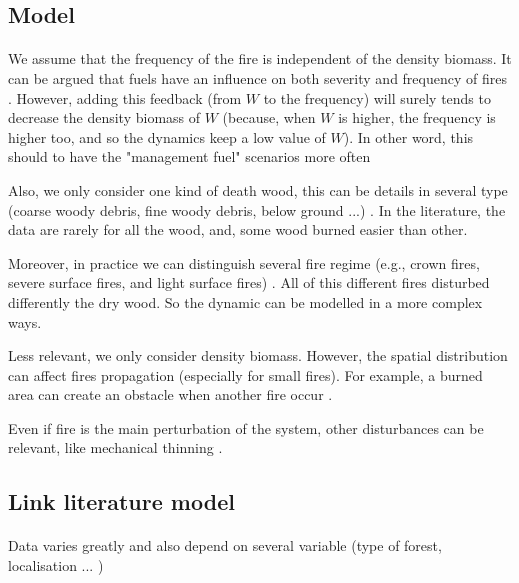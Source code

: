 \documentclass{article}
\begin{document}
\subsection{Model}


\paragraph{}
We assume that the frequency of the fire is independent of the density biomass. It can be argued that fuels have an influence on both severity and frequency  of fires \cite{schoennagel_interaction_2004}. However, adding this feedback (from $W$ to the frequency) will surely tends to decrease the density biomass of $W$ (because, when $W$ is higher, the frequency is higher too, and so the dynamics keep a low value of $W$). In other word, this should to have the "management fuel" scenarios more often

Also, we only consider one kind of death wood, this can be details in several type (coarse woody debris, fine woody debris, below ground ...) \cite{russell_quantifying_2015}. In the literature, the data are rarely for all the wood, and, some wood burned easier than other. 

Moreover, in practice we can distinguish several fire regime (e.g., crown fires, severe surface fires, and light surface fires) \cite{reichle_fire_1981}. All of this different fires disturbed differently the dry wood. So the dynamic can be modelled in a more complex ways.

Less relevant, we only consider density biomass. However, the spatial distribution can affect fires propagation (especially for small fires). For example, a burned area can create an obstacle when another fire occur \cite{bergeron_natural_2002}.

Even if fire is the main perturbation of the system, other disturbances can be relevant, like mechanical thinning \cite{liu_analyzing_2010}\cite{schoennagel_interaction_2004}\cite{wimberly_assessing_2009}.


\subsection{Link literature model}

\paragraph{}
Data varies greatly and also depend on several variable (type of forest, localisation ... )
\end{document}
